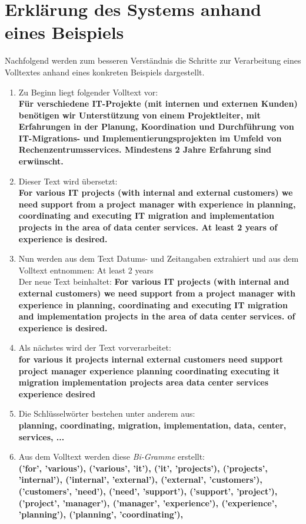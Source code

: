 \section{Erklärung des Systems anhand eines Beispiels}
Nachfolgend werden zum besseren Verständnis die Schritte zur Verarbeitung eines Volltextes anhand eines konkreten Beispiels dargestellt.\\
\begin{enumerate}
	\itemsep-0.15em
	\item Zu Beginn liegt folgender Volltext vor:\\ \textbf{Für verschiedene IT-Projekte (mit internen und externen Kunden) benötigen wir Unterstützung von einem Projektleiter, mit Erfahrungen in der Planung, Koordination und Durchführung von IT-Migrations- und Implementierungsprojekten im Umfeld von Rechenzentrumsservices. Mindestens 2 Jahre Erfahrung sind erwünscht.}
	\item Dieser Text wird übersetzt:\\ \textbf{For various IT projects (with internal and external customers) we need support from a project manager with experience in planning, coordinating and executing IT migration and implementation projects in the area of data center services. At least 2 years of experience is desired.}
	\item Nun werden aus dem Text Datums- und Zeitangaben extrahiert und aus dem Volltext entnommen: \grqq At least 2 years\grqq \\ Der neue Text beinhaltet: \textbf{For various IT projects (with internal and external customers) we need support from a project manager with experience in planning, coordinating and executing IT migration and implementation projects in the area of data center services. of experience is desired.}
	\item Als nächstes wird der Text vorverarbeitet:\\ \textbf{for various it projects internal external customers need support project manager experience planning coordinating executing it migration implementation projects area data center services experience desired}
	\item Die Schlüsselwörter bestehen unter anderem aus:\\ \textbf{planning, coordinating, migration, implementation, data, center, services, ...}
	\item Aus dem Volltext werden diese \emph{Bi-Gramme} erstellt:\\ \textbf{('for', 'various'), ('various', 'it'), ('it', 'projects'), ('projects', 'internal'), ('internal', 'external'), ('external', 'customers'), ('customers', 'need'), ('need', 'support'), ('support', 'project'), ('project', 'manager'), ('manager', 'experience'), ('experience', 'planning'), ('planning', 'coordinating'),
}
\end{enumerate}

